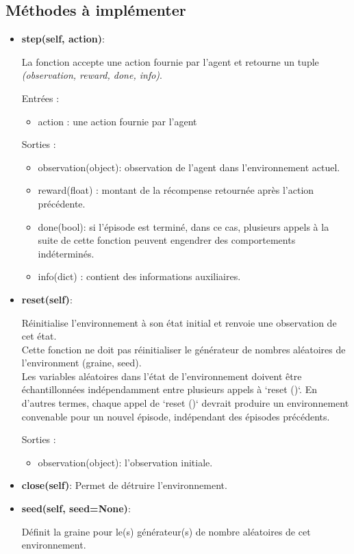 \documentclass[11pt, a4paper]{article}
\begin{document}
\subsection{ \textbf{Méthodes à implémenter\cite{openaigym}}} 

\begin{itemize}
  \item \textbf{step(self, action)}: 
  
  La fonction accepte une action fournie par l'agent et retourne un tuple \textit{(observation, reward, done, info)}. 

  Entrées :
  \begin{itemize}
	\item action : une action fournie par l'agent
  \end{itemize}	
  Sorties :
  \begin{itemize}
		\item observation(object): observation de l'agent dans l'environnement actuel.
		\item reward(float) : montant de la récompense retournée après l'action précédente.
		\item done(bool): si l'épisode est terminé, dans ce cas, plusieurs appels à la suite de cette fonction peuvent engendrer des comportements indéterminés.
		\item info(dict) : contient des informations auxiliaires.
  \end{itemize}	

	\item \textbf{reset(self)}: 
	
  	Réinitialise l'environnement à son état initial et renvoie une observation de cet état. \\
  	Cette fonction ne doit pas réinitialiser le générateur de nombres aléatoires de l'environment (graine, seed). \\
	Les variables aléatoires dans l'état de l'environnement doivent	être échantillonnées indépendamment entre plusieurs appels à `reset ()`. 
	En d'autres termes, chaque appel de `reset ()` devrait produire un environnement convenable pour
	un nouvel épisode, indépendant des épisodes précédents.

	Sorties :
	\begin{itemize}
		  \item observation(object): l'observation initiale.
	\end{itemize}	

	\item \textbf{close(self)}:
	Permet de détruire l'environnement. \\

	\item \textbf{seed(self, seed=None)}:
	
	Définit la graine pour le(s) générateur(s) de nombre aléatoires de cet environnement.

\end{itemize}
\end{document}
